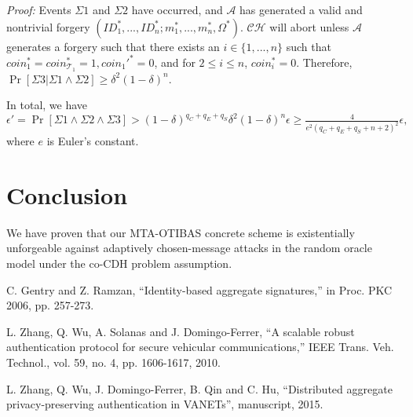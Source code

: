 \documentclass[10pt,journal,compsoc]{IEEEtran}
\begin{document}
\emph{Proof:}
Events $\Sigma1$ and $\Sigma2$ have occurred, and $\mathcal {A}$
has generated a valid and nontrivial forgery
$(ID_1^*,...,ID_n^*;m_1^*,...,m_n^*,\Omega^*)$. $\mathcal {CH}$ will
abort unless $\mathcal {A}$ generates a forgery such that there
exists an $i\in \{1,...,n\}$ such that
$coin_1^*=coin_{\mathcal{T}_1}^*=1,coin_1'^*=0$, and for  $2\leq
i\leq n$, $coin_i^*=0$. Therefore, $\Pr[\Sigma3|\Sigma1\wedge
\Sigma2]\geq \delta^2(1-\delta)^n$.

\medskip
\indent In total, we have
$\epsilon'=\Pr[\Sigma1\wedge \Sigma2\wedge \Sigma3]
>(1-\delta)^{q_C+q_E+q_S}\delta^2(1-\delta)^n \epsilon
\geq \frac{4}{e^2(q_C+q_E+q_S+n+2)^2}\epsilon,$
where $e$ is Euler's constant.



\section{Conclusion}\label{Conclusion}

We have proven that our MTA-OTIBAS concrete scheme is existentially
unforgeable against adaptively chosen-message attacks in
the random oracle model under the co-CDH problem
assumption.


\begin{thebibliography}{99}

 C. Gentry and Z. Ramzan, ``Identity-based aggregate signatures,'' in Proc. PKC 2006, pp. 257-273.






 L. Zhang, Q. Wu, A. Solanas and J. Domingo-Ferrer, ``A scalable robust authentication protocol for secure vehicular communications,'' IEEE Trans. Veh. Technol., vol. 59, no. 4, pp. 1606-1617, 2010.

 L. Zhang, Q. Wu, J. Domingo-Ferrer, B. Qin and
C. Hu, ``Distributed aggregate privacy-preserving authentication
in VANETs'', manuscript, 2015.

\end{thebibliography}
\end{document}
